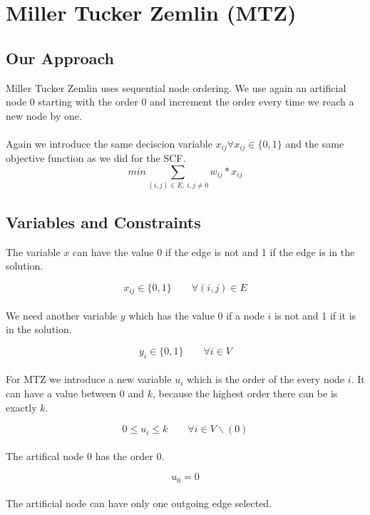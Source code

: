 \section{Miller Tucker Zemlin (MTZ)}

\subsection{Our Approach}
Miller Tucker Zemlin uses sequential node ordering. We use again an artificial node $0$ starting with the order $0$ and increment the order every time we reach a new node by one.\\
\\ 
Again we introduce the same deciscion variable $x_{ij} \forall x_{ij} \in \{0,1\}$ and the same objective function as we did for the SCF.\\

\begin{equation}
  min \sum_{(i,j) \in E , \ i,j \not = 0} {w_{ij} * x_{ij}}
\end{equation}


\subsection{Variables and Constraints}
The variable $x$ can have the value 0 if the edge is not and 1 if the edge is in the solution. 

\begin{equation}
  x_{ij} \in \{0,1\} \qquad \forall (i,j) \in E
\end{equation}
\\
We need another variable $y$ which has the value 0 if a node $i$ is not and 1 if it is in the solution.

\begin{equation}
  y_i \in \{0,1\} \qquad \forall i \in V
\end{equation}
\\
For MTZ we introduce a new variable $u_i$ which is the order of the every node $i$. It can have a value between 0 and $k$, because the highest order there can be is exactly $k$.

\begin{equation}
  0 \leq u_i \leq k \qquad \forall i \in V \backslash (0) 
\end{equation}
\\
The artifical node $0$ has the order $0$.

\begin{equation}
  u_0 = 0 
\end{equation}
\\
The artificial node can have only one outgoing edge selected.

